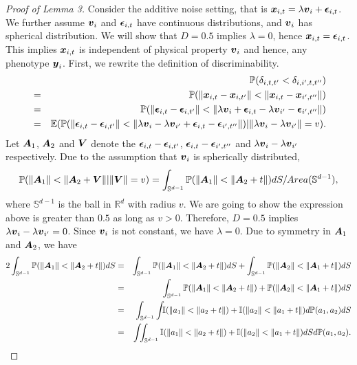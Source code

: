 \documentclass{article}
\begin{document}
\begin{proof}[Proof of Lemma 3]
	Consider the additive noise setting, that is $\boldsymbol{x}_{i,t}=\lambda \boldsymbol{v}_{i} + \boldsymbol{\epsilon}_{i,t}$. We further assume  $\boldsymbol{v}_{i}$ and $\boldsymbol{\epsilon}_{i,t}$ have continuous distributions, and $\boldsymbol{v}_{i} $ has spherical distribution. We will show that $D=0.5$ implies $\lambda = 0$, hence $\boldsymbol{x}_{i,t} = \boldsymbol{\epsilon}_{i,t}$. This implies $\boldsymbol{x}_{i,t}$ is independent of physical property $\boldsymbol{v}_{i}$ and hence,  any phenotype $\boldsymbol{y}_{i}$. First, we rewrite the definition of discriminability.
	\begin{eqnarray*}
		& &\mathbb{P}(\delta_{i,t,t'} < \delta_{i,i',t,t''}) \\
		&=&\mathbb{P}(\|\boldsymbol{x}_{i,t}-\boldsymbol{x}_{i,t'}\|<\|\boldsymbol{x}_{i,t}-\boldsymbol{x}_{i',t''}\|) \\
		&=&\mathbb{P}(\|\boldsymbol{\epsilon}_{i,t}-\boldsymbol{\epsilon}_{i,t'}\| < \|\lambda \boldsymbol{v}_{i}+\boldsymbol{\epsilon}_{i,t}-\lambda \boldsymbol{v}_{i'} - \boldsymbol{\epsilon}_{i',t''}\|) \\
		&=& \mathbb{E} (\mathbb{P}(\|\boldsymbol{\epsilon}_{i,t}-\boldsymbol{\epsilon}_{i,t'}\| < \|\lambda \boldsymbol{v}_{i} - \lambda \boldsymbol{v}_{i'}+\boldsymbol{\epsilon}_{i,t} - \boldsymbol{\epsilon}_{i',t''}\|)|\|\lambda \boldsymbol{v}_{i} - \lambda \boldsymbol{v}_{i'} \|=v).
	\end{eqnarray*}
	Let $\boldsymbol{A}_1$, $\boldsymbol{A}_2$ and $\boldsymbol{V}$ denote the $\boldsymbol{\epsilon}_{i,t}-\boldsymbol{\epsilon}_{i,t'}$, $\boldsymbol{\epsilon}_{i,t} - \boldsymbol{\epsilon}_{i',t''}$ and $\lambda \boldsymbol{v}_{i} - \lambda \boldsymbol{v}_{i'}$ respectively. Due to the assumption that $\boldsymbol{v}_{i}$ is spherically distributed, 
	\[\mathbb{P}(\| \boldsymbol{A}_1 \| < \|\boldsymbol{A}_2+\boldsymbol{V}\||\|\boldsymbol{V} \|=v) = \int_{\mathbb{S}^{d-1}} \mathbb{P}(\| \boldsymbol{A}_1 \| < \|\boldsymbol{A}_2+t\|) dS / Area(\mathbb{S}^{d-1}),\]
	where $\mathbb{S}^{d-1}$ is the ball in $\mathbb{R}^{d}$ with radius $v$. We are going to show the expression above is greater than $0.5$ as long as $v > 0$. Therefore, $D=0.5$ implies $\lambda \boldsymbol{v}_{i} - \lambda \boldsymbol{v}_{i'}= 0$. Since $\boldsymbol{v}_{i}$ is not constant, we have $\lambda = 0$. Due to symmetry in $\boldsymbol{A}_1$ and $\boldsymbol{A}_2$, we have
	\begin{eqnarray*}
		2\int_{\mathbb{S}^{d-1}} \PP(\| \bA_1 \| < \|\bA_2+t\|)dS &=& \int_{\mathbb{S}^{d-1}} \PP(\| \bA_1 \| < \|\bA_2+t\|)dS +  \int_{ \mathbb{S}^{d-1}} \PP(\| \bA_2 \| < \|\bA_1+t\|)dS \\
		&=& \int_{\mathbb{S}^{d-1}} \PP(\| \bA_1 \| < \|\bA_2+t\|) + \PP(\| \bA_2 \| < \|\bA_1+t\|) dS \\
		&=& \int_{\mathbb{S}^{d-1}} \int_{} \II(\| a_1 \| < \|a_2+t\|) + \II(\| a_2 \| < \|a_1+t\|)d\PP(a_1,a_2) dS \\
		&=&  \int_{} \int_{\mathbb{S}^{d-1}}\II(\| a_1 \| < \|a_2+t\|) + \II(\| a_2 \| < \|a_1+t\|) dS d\PP(a_1,a_2).\\

\end{eqnarray*}
\end{proof}
\end{document}
